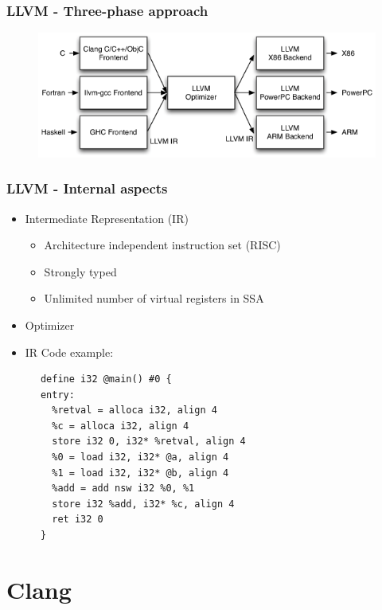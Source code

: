 \documentclass{beamer}
\begin{document}
\begin{frame}
\frametitle{LLVM - Three-phase approach}
\begin{figure}
\includegraphics[width=0.8\linewidth]{img/llvm_struct.png}
\end{figure}
\end{frame}

\begin{frame}[fragile]
\frametitle{LLVM - Internal aspects}
\begin{itemize}
  \item Intermediate Representation (IR)
  \begin{itemize}
    \item Architecture independent instruction set (RISC)
    \item Strongly typed
    \item Unlimited number of virtual registers in SSA
  \end{itemize}
  \item Optimizer
  \item IR Code example:
\end{itemize}

\begin{lstlisting}
      define i32 @main() #0 {
      entry:
        %retval = alloca i32, align 4
        %c = alloca i32, align 4
        store i32 0, i32* %retval, align 4
        %0 = load i32, i32* @a, align 4
        %1 = load i32, i32* @b, align 4
        %add = add nsw i32 %0, %1
        store i32 %add, i32* %c, align 4
        ret i32 0
      }
\end{lstlisting}
\end{frame}


\section{Clang}
\end{document}
